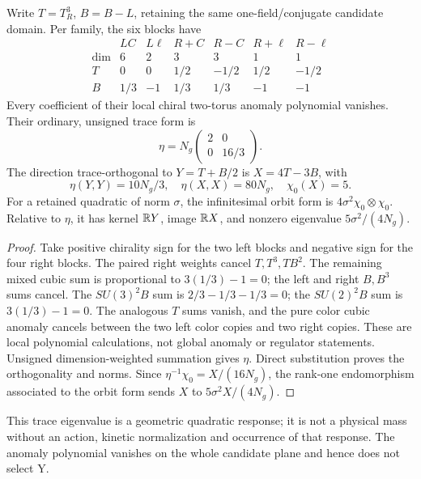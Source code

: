 \documentclass[11pt,a4paper]{article}
\begin{document}
\begin{proposition}
\label{p5:prop:pre-y-trace-anomaly-plane}
\label{p5:prop:pre-y-abelian-trace-and-anomalies}
Write \(T=T_R^3\), \(B=B-L\), retaining the same one-field/conjugate
candidate domain.  Per family, the six blocks have
\[
\begin{array}{c|rrrrrr}
 &LC&L\ell&R+C&R-C&R+\ell&R-\ell\\ \hline
 \dim&6&2&3&3&1&1\\
 T&0&0&1/2&-1/2&1/2&-1/2\\
 B&1/3&-1&1/3&1/3&-1&-1
\end{array}
\]
Every coefficient of their local chiral two-torus anomaly
polynomial vanishes.  Their ordinary, unsigned trace form is
\[
 \eta=N_g\begin{pmatrix}2&0\\0&16/3\end{pmatrix}.
\]
The direction trace-orthogonal to \(Y=T+B/2\) is
\(X=4T-3B\), with
\[
 \eta(Y,Y)=10N_g/3,\quad \eta(X,X)=80N_g,\quad \chi_0(X)=5.
\]
For a retained quadratic of norm \(\sigma\), the infinitesimal
orbit form is \(4\sigma^2\chi_0\otimes\chi_0\).  Relative to
\(\eta\), it has kernel \(\mathbb{R} Y\), image \(\mathbb{R} X\), and
nonzero eigenvalue \(5\sigma^2/(4N_g)\).
\end{proposition}
\begin{proof}
Take positive chirality sign for the two left blocks and
negative sign for the four right blocks.  The paired right
weights cancel \(T,T^3,TB^2\).  The remaining mixed cubic
sum is proportional to \(3(1/3)-1=0\); the left and right
\(B,B^3\) sums cancel.  The \(SU(3)^2B\) sum is
\(2/3-1/3-1/3=0\); the \(SU(2)^2B\) sum is
\(3(1/3)-1=0\).  The analogous \(T\) sums vanish, and the
pure color cubic anomaly cancels between the two left color
copies and two right copies.  These are local polynomial
calculations, not global anomaly or regulator statements.
Unsigned dimension-weighted summation gives \(\eta\).
Direct substitution proves the orthogonality and norms.
Since \(\eta^{-1}\chi_0=X/(16N_g)\), the rank-one
endomorphism associated to the orbit form sends \(X\) to
\(5\sigma^2X/(4N_g)\).
\end{proof}

This trace eigenvalue is a geometric quadratic response; it is
not a physical mass without an action, kinetic normalization
and occurrence of that response.  The anomaly polynomial
vanishes on the whole candidate plane and hence does not select Y.
\end{document}
